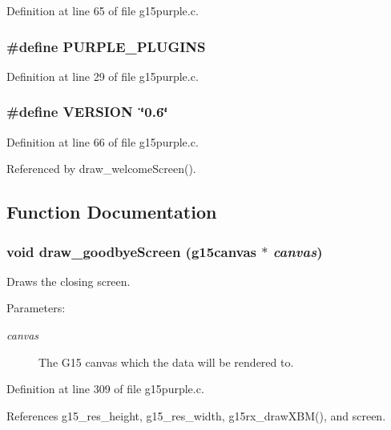 Definition at line 65 of file g15purple.c.
\subsubsection{\setlength{\rightskip}{0pt plus 5cm}\#define PURPLE\_\-PLUGINS}\label{g15purple_8c_0f40654b416236bb51e039f02aeababf}




Definition at line 29 of file g15purple.c.
\subsubsection{\setlength{\rightskip}{0pt plus 5cm}\#define VERSION~\char`\"{}0.6\char`\"{}}\label{g15purple_8c_1c6d5de492ac61ad29aec7aa9a436bbf}




Definition at line 66 of file g15purple.c.

Referenced by draw\_\-welcomeScreen().

\subsection{Function Documentation}
\subsubsection{\setlength{\rightskip}{0pt plus 5cm}void draw\_\-goodbyeScreen (g15canvas $\ast$ {\em canvas})}\label{g15purple_8c_5f79f644faaedfa3ccae24f86cb38779}


Draws the closing screen.

\begin{Desc}
\item[Parameters:]
\begin{description}
\item[{\em canvas}]The G15 canvas which the data will be rendered to.  \end{description}
\end{Desc}


Definition at line 309 of file g15purple.c.

References g15\_\-res\_\-height, g15\_\-res\_\-width, g15rx\_\-drawXBM(), and screen.
